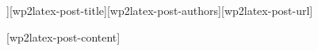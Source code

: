 \chaptitlepage[[wp2latex-post-subtitle]]{[wp2latex-post-title]}{[wp2latex-post-authors]}{[wp2latex-post-url]}

[wp2latex-post-content]
